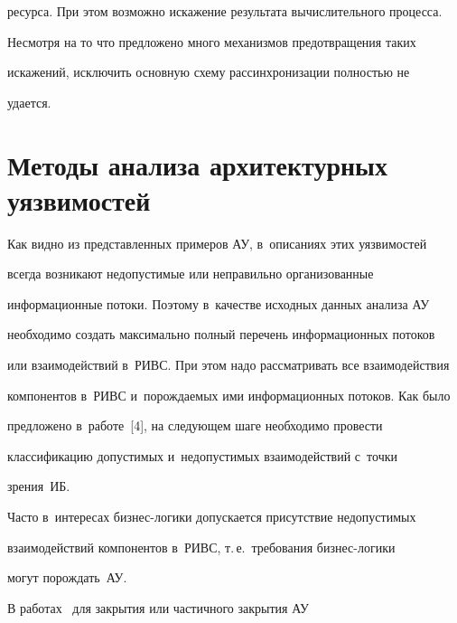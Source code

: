 ресурса. При этом возможно искажение результата вычислительного процесса. 


Несмотря на то что предложено много механизмов предотвращения таких 


искажений, исключить основную схему рассинхронизации полностью не 


удается. 





\vspace*{-4pt}


  


\section{Методы анализа архитектурных уязвимостей}





\vspace*{-2pt}





  Как видно из представленных примеров АУ, в~описаниях этих уязвимостей 


всегда возникают недопустимые или неправильно организованные 


информационные потоки. Поэтому в~качестве исходных данных анализа АУ 


необходимо создать максимально полный перечень информационных потоков 


или взаимодействий в~РИВС. При этом надо рассматривать все взаимодействия 


компонентов в~РИВС и~порождаемых ими информационных потоков. Как было 


предложено в~работе~[4], на следующем шаге необходимо провести 


классификацию допустимых и~недопустимых взаимодействий с~точки 


зрения~ИБ. 


  


  Часто в~интересах бизнес-логики допускается присутствие недопустимых 


взаимодействий компонентов в~РИВС, т.\,е.\ требования биз\-нес-ло\-ги\-ки 


могут порождать~АУ. 


  


  В работах~\cite{4-g2, 5-g2, 13-g2} для закрытия или частичного закрытия АУ 



